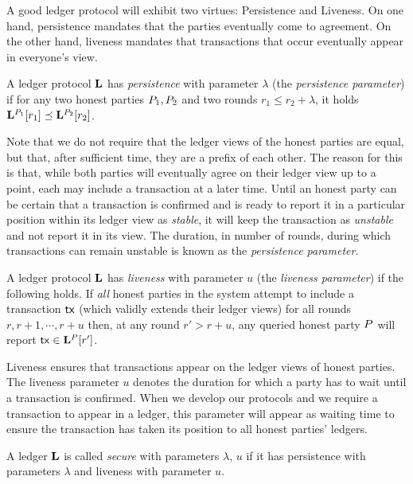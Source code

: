 A good ledger protocol will exhibit two virtues: Persistence and Liveness. On
one hand, persistence mandates that the parties eventually come to agreement.
On the other hand, liveness mandates that transactions that occur eventually
appear in everyone's view.

\begin{definition}[Persistence]
  A ledger protocol $\mathbf{L}$ has \emph{persistence} with parameter $\lambda$
  (the \emph{persistence parameter}) if for
  any two honest parties $P_1,P_2$ and two rounds $r_1\leq r_2 +
  \lambda$, it holds $\mathbf{L}^{P_1}[r_1] \preceq
  \mathbf{L}^{P_2}[r_2]$.
\end{definition}

Note that we do not require that the ledger views of the honest parties are
equal, but that, after sufficient time, they are a prefix of each other. The
reason for this is that, while both parties will eventually agree on their
ledger view up to a point, each may include a transaction at a later time. Until
an honest party can be certain that a transaction is confirmed and is ready to
report it in a particular position within its ledger view as \emph{stable}, it
will keep the transaction as \emph{unstable} and not report it in its view. The
duration, in number of rounds, during which transactions can remain unstable is
known as the \emph{persistence parameter}.

\begin{definition}[Liveness]
  A ledger protocol $\mathbf{L}$ has \emph{liveness} with parameter $u$ (the
  \emph{liveness parameter}) if the following holds.
  If \emph{all} honest parties in the system attempt to include a transaction
  $\mathsf{tx}$ (which validly extends their ledger views) for all rounds $r, r + 1, \cdots, r
  + u$ then, at any round $r' > r + u$, any queried honest party $P$ will
  report $\mathsf{tx} \in \mathbf{L}^{P}[r']$.
\end{definition}

Liveness ensures that transactions appear on the ledger views of honest parties.
The liveness parameter $u$ denotes the duration for which a party has to wait
until a transaction is confirmed. When we develop our protocols and we require
a transaction to appear in a ledger, this parameter will appear as waiting time
to ensure the transaction has taken its position to all honest parties' ledgers.

\begin{definition}
  A ledger $\mathbf{L}$ is called \emph{secure} with parameters $\lambda$, $u$ if
  it has persistence with parameters $\lambda$ and liveness with parameter $u$.
\end{definition}


